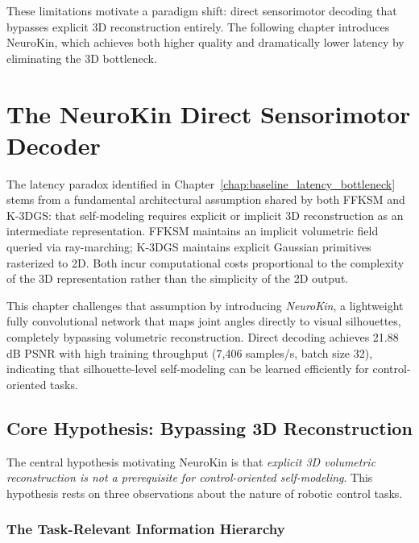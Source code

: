 \documentclass[12pt,a4paper,oneside]{report}
\begin{document}
These limitations motivate a paradigm shift: direct sensorimotor decoding that bypasses explicit 3D reconstruction entirely. The following chapter introduces NeuroKin, which achieves both higher quality and dramatically lower latency by eliminating the 3D bottleneck.

\clearpage

\chapter{The NeuroKin Direct Sensorimotor Decoder}
\label{chap:neurokin_decoder}

The latency paradox identified in Chapter~\ref{chap:baseline_latency_bottleneck} stems from a fundamental architectural assumption shared by both FFKSM and K-3DGS: that self-modeling requires explicit or implicit 3D reconstruction as an intermediate representation. FFKSM maintains an implicit volumetric field queried via ray-marching; K-3DGS maintains explicit Gaussian primitives rasterized to 2D. Both incur computational costs proportional to the complexity of the 3D representation rather than the simplicity of the 2D output.

This chapter challenges that assumption by introducing \textit{NeuroKin}, a lightweight fully convolutional network that maps joint angles directly to visual silhouettes, completely bypassing volumetric reconstruction. Direct decoding achieves 21.88 dB PSNR with high training throughput (7,406 samples/s, batch size 32), indicating that silhouette-level self-modeling can be learned efficiently for control-oriented tasks.

\section{Core Hypothesis: Bypassing 3D Reconstruction}

The central hypothesis motivating NeuroKin is that \textit{explicit 3D volumetric reconstruction is not a prerequisite for control-oriented self-modeling}. This hypothesis rests on three observations about the nature of robotic control tasks.

\subsection{The Task-Relevant Information Hierarchy}
\label{subsec:the_task_relevant_information_hierarchy}
\end{document}
